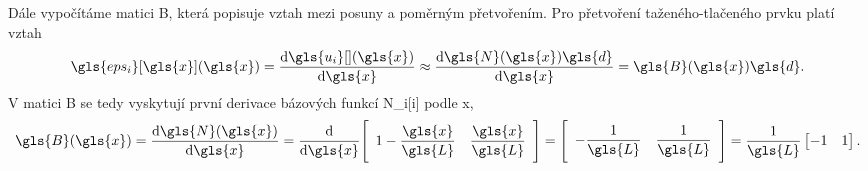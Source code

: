 Dále vypočítáme matici \gls{B}, která popisuje vztah mezi posuny a poměrným přetvořením. Pro přetvoření taženého-tlačeného prvku platí vztah
\begin{equation}
    \gls{eps_i}[\gls{x}](\gls{x}) = \dv{\gls{u_i}[ ](\gls{x})}{\gls{x}} \approx \dv{\gls{N}(\gls{x}) \gls{d}}{\gls{x}} = \gls{B}(\gls{x})\gls{d}.
\end{equation}
V matici \gls{B} se tedy vyskytují první derivace bázových funkcí \gls{N_i}[i] podle \gls{x},
\begin{equation} \label{eq:bar_B}
    \gls{B}(\gls{x}) = \dv{\gls{N}(\gls{x})}{\gls{x}}
    =
    \dv{\gls{x}} 
    \Bigg[
        \begin{array}{cc}
            1 - \dfrac{\gls{x}}{\gls{L}} & \dfrac{\gls{x}}{\gls{L}}
        \end{array}
    \Bigg]
    =
    \Bigg[
        \begin{array}{cc}
            -\dfrac{1}{\gls{L}} & \dfrac{1}{\gls{L}}
        \end{array}
    \Bigg]
    =
    \frac{1}{\gls{L}}
    \begin{bmatrix}
        -1 & 1
    \end{bmatrix}.
\end{equation}

